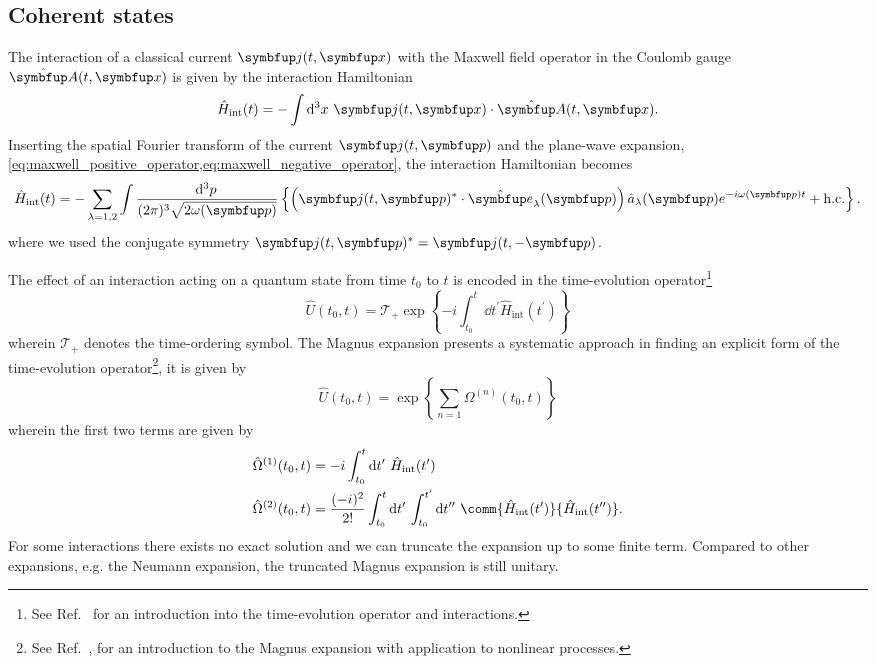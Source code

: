 \subsection{Coherent states}

The interaction of a classical current $\vb{j}(t,\vb{x})$ with the Maxwell field operator in the Coulomb gauge $\vu{A}(t,\vb{x})$ is given by the interaction Hamiltonian
\begin{equation}
	\hat{H}_\text{int}(t)
	=
	-
	\int\dd[3]{x}
	\vb{j}(t,\vb{x})
	\vdot
	\hat{\vb{A}}(t,\vb{x})
	.
\end{equation}
Inserting the spatial Fourier transform of the current $\vb{j}(t,\vb{p})$ and the plane-wave expansion, \cref{eq:maxwell_positive_operator,eq:maxwell_negative_operator}, the interaction Hamiltonian becomes
\begin{equation}
	\hat{H}_\text{int}(t)
	=
	-
	\sum_{\lambda=1,2}
	\int\frac{\dd[3]{p}}{(2\pi)^3\sqrt{2\omega(\vb{p})}}
	\left\{
		\left(
			\vb{j}(t,\vb{p})^*
			\vdot
			\vu{e}_\lambda(\vb{p})
		\right)
		\hat{a}_\lambda(\vb{p})
		e^{-i\omega(\vb{p})t}
		+
		\text{h.c.}
	\right\}
	\label{eq:classical_current_interaction}
	.
\end{equation}
where we used the conjugate symmetry $\vb{j}(t,\vb{p})^*=\vb{j}(t,-\vb{p})$.

The effect of an interaction acting on a quantum state from time $t_0$ to $t$ is encoded in the time-evolution operator\footnote{See Ref.~\cite[p.~215]{Greiner2013} for an introduction into the time-evolution operator and interactions.}
\begin{equation}
	\hat{U}(t_0,t)
	=
	\mathcal{T}_+
	\exp\left\{
		-i
		\int_{t_0}^t\dd{t^\prime}
		\hat{H}_\text{int}(t^\prime)
	\right\}
	\label{eq:time_evolution_operator}
\end{equation}
wherein $\mathcal{T}_+$ denotes the time-ordering symbol.
The Magnus expansion presents a systematic approach in finding an explicit form of the time-evolution operator\footnote{See Ref.~\cite[p.~42]{QuesadaMejia2015}, for an introduction to the Magnus expansion with application to nonlinear processes.}, it is given by
\begin{equation}
	\hat{U}(t_0,t)
	=
	\exp\left\{
		\sum_{n=1}
		\Omega^{(n)}(t_0,t)
	\right\}
\end{equation}
wherein the first two terms are given by
\begin{align}
	\hat{\Omega}^{(1)}(t_0,t)
	&=
	-i
	\int_{t_0}^t\dd{t^\prime}
	\hat{H}_\text{int}(t^\prime)
	\\
	\hat{\Omega}^{(2)}(t_0,t)
	&=
	\frac{(-i)^2}{2!}
	\int_{t_0}^t\dd{t^\prime}
	\int_{t_0}^{t^\prime}\dd{t^{\prime\prime}}
	\comm{\hat{H}_\text{int}(t^\prime)}{\hat{H}_\text{int}(t^{\prime\prime})}
	.
\end{align}
For some interactions there exists no exact solution and we can truncate the expansion up to some finite term.
Compared to other expansions, e.g. the Neumann expansion, the truncated Magnus expansion is still unitary.

